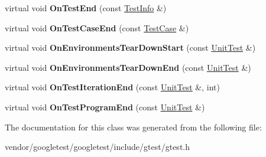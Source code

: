 \begin{DoxyCompactItemize}
\item 
virtual void {\bfseries On\+Test\+End} (const \hyperlink{classtesting_1_1TestInfo}{Test\+Info} \&)\hypertarget{classtesting_1_1EmptyTestEventListener_afd58d21005f0d0d0399fb114627545d3}{}\label{classtesting_1_1EmptyTestEventListener_afd58d21005f0d0d0399fb114627545d3}

\item 
virtual void {\bfseries On\+Test\+Case\+End} (const \hyperlink{classtesting_1_1TestCase}{Test\+Case} \&)\hypertarget{classtesting_1_1EmptyTestEventListener_a6bec703158283104c4298f7d8a528515}{}\label{classtesting_1_1EmptyTestEventListener_a6bec703158283104c4298f7d8a528515}

\item 
virtual void {\bfseries On\+Environments\+Tear\+Down\+Start} (const \hyperlink{classtesting_1_1UnitTest}{Unit\+Test} \&)\hypertarget{classtesting_1_1EmptyTestEventListener_a00fa1a4ea5831e20746188414268e7c6}{}\label{classtesting_1_1EmptyTestEventListener_a00fa1a4ea5831e20746188414268e7c6}

\item 
virtual void {\bfseries On\+Environments\+Tear\+Down\+End} (const \hyperlink{classtesting_1_1UnitTest}{Unit\+Test} \&)\hypertarget{classtesting_1_1EmptyTestEventListener_aea64c83c415b33a4c0b0239bafd1438d}{}\label{classtesting_1_1EmptyTestEventListener_aea64c83c415b33a4c0b0239bafd1438d}

\item 
virtual void {\bfseries On\+Test\+Iteration\+End} (const \hyperlink{classtesting_1_1UnitTest}{Unit\+Test} \&, int)\hypertarget{classtesting_1_1EmptyTestEventListener_a2253e5a18b3cf7bccd349567a252209d}{}\label{classtesting_1_1EmptyTestEventListener_a2253e5a18b3cf7bccd349567a252209d}

\item 
virtual void {\bfseries On\+Test\+Program\+End} (const \hyperlink{classtesting_1_1UnitTest}{Unit\+Test} \&)\hypertarget{classtesting_1_1EmptyTestEventListener_a0abcc02bd2331a2e29ad6f4d9daf2a32}{}\label{classtesting_1_1EmptyTestEventListener_a0abcc02bd2331a2e29ad6f4d9daf2a32}

\end{DoxyCompactItemize}


The documentation for this class was generated from the following file\+:\begin{DoxyCompactItemize}
\item 
vendor/googletest/googletest/include/gtest/gtest.\+h\end{DoxyCompactItemize}
